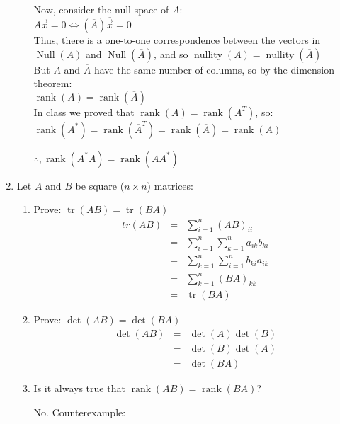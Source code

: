 \documentclass[letterpaper,12pt,fleqn]{article}
\DeclareMathOperator{\nul}{Null}
\DeclareMathOperator{\nuly}{nullity}
\DeclareMathOperator{\rank}{rank}
\DeclareMathOperator{\tr}{tr}
\newcommand{\vx}{\vec{x}}
\newcommand{\conj}[1]{\overline{#1}}
\begin{document}
\begin{enumerate}
\begin{enumerate}
    Now, consider the null space of $A$: \\
    $A\vx=0\iff(\conj{A})\conj{\vx}=0$ \\
    Thus, there is a one-to-one correspondence between the vectors in $\nul(A)$
    and $\nul(\conj{A})$, and so $\nuly(A)=\nuly(\conj{A})$ \\
    But $A$ and $\conj{A}$ have the same number of columns, so by the
    dimension theorem: \\
    $\rank(A)=\rank(\conj{A})$ \\
    In class we proved that $\rank(A)=\rank(A^T)$, so: \\
    $\rank(A^*)=\rank(\conj{A}^T)=\rank(\conj{A})=\rank(A)$

    $\therefore,\rank(A^*A)=\rank(AA^*)$
    
  \end{enumerate}

\item Let $A$ and $B$ be square ($n\times n$) matrices:
  \begin{enumerate}
  \item Prove: $\tr(AB)=\tr(BA)$
    \begin{eqnarray*}
      tr(AB) &=& \sum_{i=1}^n(AB)_{ii} \\
      &=& \sum_{i=1}^n\sum_{k=1}^na_{ik}b_{ki} \\
      &=& \sum_{k=1}^n\sum_{i=1}^nb_{ki}a_{ik} \\
      &=& \sum_{k=1}^n(BA)_{kk} \\
      &=& \tr(BA)
    \end{eqnarray*}

  \item Prove: $\det(AB)=\det(BA)$
    \begin{eqnarray*}
      \det(AB) &=& \det(A)\det(B) \\
      &=& \det(B)\det(A) \\
      &=& \det(BA)
    \end{eqnarray*}

  \item Is it always true that $\rank(AB)=\rank(BA)$?

    No. Counterexample:

    \newcommand{\ma}{\begin{bmatrix} 1 & -1 \\ 0 & 0 \end{bmatrix}}
    \newcommand{\mb}{\begin{bmatrix} 1 & 0 \\ 1 & 0 \end{bmatrix}}


\end{enumerate}
\end{enumerate}
\end{document}
